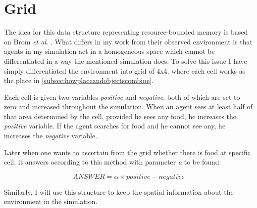 \section{Grid}
\label{sec:grid}

The idea for this data structure representing resource-bounded memory is based on Brom \textit{et al.} \cite{Brom:placeandobjects}. What differs in my work from their observed environment is that agents in my simulation act in a homogeneous space which cannot be differentiated in a way the mentioned simulation does. To solve this issue I have simply differentiated the environment into grid of 4x4, where each cell works as the place in \ref{subsec:howplaceandobjectscombine}.  

Each cell is given two variables \emph{positive} and \emph {negative}, both of which are set to zero and increased throughout the simulation. When an agent sees at least half of that area determined by the cell, provided he sees any food, he increases the \emph{positive} variable. If the agent searches for food and he cannot see any, he increases the \emph{negative} variable.

Later when one wants to ascertain from the grid whether there is food at specific cell, it answers according to this method with parameter {\emph a} to be found:

\begin{equation} ANSWER = \alpha\times positive - negative 
\end{equation}
 
Similarly, I will use this structure to keep the spatial information about the environment in the simulation.